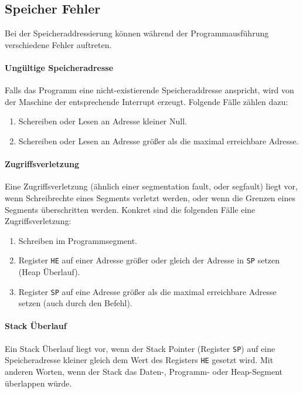\subsection{Speicher Fehler}
\label{subsec:Speicherfehler}

Bei der Speicheraddressierung können während der Programmausführung
verschiedene Fehler auftreten.

\paragraph{Ungültige Speicheradresse}
Falls das Programm eine nicht-existierende Speicheraddresse anspricht, wird von
der Maschine der entsprechende Interrupt erzeugt. Folgende Fälle zählen dazu:
\begin{enumerate}
 \item Schereiben oder Lesen an Adresse kleiner Null.
 \item Schereiben oder Lesen an Adresse größer als die maximal erreichbare
       Adresse.
\end{enumerate}


\paragraph{Zugriffsverletzung}

Eine Zugriffsverletzung (ähnlich einer \glqq segmentation fault\grqq, oder
\glqq segfault\grqq)  liegt vor, wenn Schreibrechte
eines Segments verletzt werden, oder wenn die Grenzen eines Segments
überschritten werden. Konkret sind die folgenden Fälle eine Zugriffsverletzung:
\begin{enumerate}
 \item Schreiben im Programmsegment.
 \item Register \texttt{HE} auf einer Adresse größer oder gleich der Adresse in
       \texttt{SP} setzen (Heap Überlauf).
 \item Register \texttt{SP} auf eine Adresse größer als die maximal erreichbare
       Adresse setzen (auch durch den  Befehl).
\end{enumerate}



\paragraph{Stack Überlauf}
Ein Stack Überlauf liegt vor, wenn der Stack Pointer (Register \texttt{SP})
 auf eine Speicheradresse kleiner gleich dem Wert des
Registers \texttt{HE} gesetzt wird. Mit anderen Worten, wenn der Stack das
Daten-, Programm- oder Heap-Segment überlappen würde.


